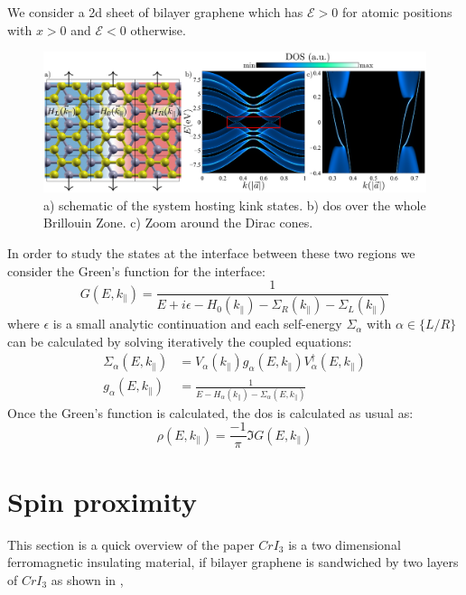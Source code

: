 We consider a 2d sheet of bilayer graphene which has $\mathcal{E}>0$ for atomic positions with $x>0$ and $\mathcal{E}<0$ otherwise.
\begin{figure}[h!]
\centering
\includegraphics{graphene_bilayer/figures/kink_states.pdf}
\vspace{-5pt}
\caption{a) schematic of the system hosting kink states. b) \ac{dos} over the whole Brillouin Zone. c) Zoom around the Dirac cones.}
\label{kink_states}
\end{figure}
\FloatBarrier
In order to study the states at the interface between these two regions we consider the Green's function for the interface:
\begin{equation}
  G(E,k_{\parallel}) = \frac{1}{E+i\epsilon-H_0(k_\parallel)-\Sigma_R(k_\parallel)-\Sigma_L(k_\parallel)}
\end{equation}
where $\epsilon$ is a small analytic continuation and each self-energy $\Sigma_\alpha$ with $\alpha\in\{L/R\}$ can be calculated by solving iteratively the coupled equations:
\begin{equation}
\begin{split}
  \Sigma_\alpha(E,k_\parallel) &= V_\alpha(k_\parallel)g_\alpha(E,k_\parallel)V^{\dagger}_\alpha(E,k_\parallel) \\
  g_\alpha(E,k_\parallel) &= \frac{1}{E-H_\alpha(k_\parallel)-\Sigma_\alpha(E,k_\parallel)}
\end{split}
\end{equation}
Once the Green's function is calculated, the \ac{dos} is calculated as usual as:
\begin{equation}
   \rho(E,k_\parallel) = \frac{-1}{\pi}\Im{G(E,k_{\parallel})}
\end{equation}



\section{Spin proximity}
This section is a quick overview of the paper $CrI_3$ is a two dimensional ferromagnetic insulating material\cite{Klein2018,Song2018,Wang2018}, %
if bilayer graphene is sandwiched by two layers of $CrI_3$ as shown in ,

